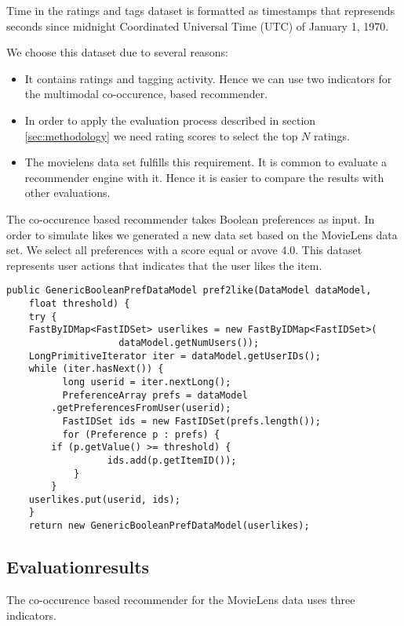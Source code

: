 Time in the ratings and tags dataset is formatted as timestamps that represends seconds since midnight Coordinated Universal Time (UTC) of January 1, 1970.
 
We choose this dataset due to several reasons:
\begin{itemize}
\item It contains ratings and tagging activity. Hence we can use two indicators for the multimodal co-occurence, based recommender.
\item In order to apply the evaluation process described in section \ref{sec:methodology} we need rating scores to select the top $N$ ratings.
\item The movielens data set fulfills this requirement. It is common to evaluate a recommender engine with it. Hence it is easier to compare the results with other evaluations. 
\end{itemize}

The co-occurence based recommender takes Boolean preferences as input. In order to simulate likes we generated a new data set based on the MovieLens data set. We select all preferences with a score  equal or avove 4.0. This dataset represents user actions that indicates that the user likes the item.

\begin{lstlisting}[caption={To simulate the user action ``like'' we extract all ratings equal or above a score of 4.0 and use the result as training set},label={lst:pref2like}]
 public GenericBooleanPrefDataModel pref2like(DataModel dataModel,
	float threshold) {
	try {
	FastByIDMap<FastIDSet> userlikes = new FastByIDMap<FastIDSet>(
					dataModel.getNumUsers());
	LongPrimitiveIterator iter = dataModel.getUserIDs();
	while (iter.hasNext()) {
          long userid = iter.nextLong();
          PreferenceArray prefs = dataModel
		.getPreferencesFromUser(userid);
          FastIDSet ids = new FastIDSet(prefs.length());
          for (Preference p : prefs) {
		if (p.getValue() >= threshold) {
                  ids.add(p.getItemID());
			}
		}
	userlikes.put(userid, ids);
	}
    return new GenericBooleanPrefDataModel(userlikes);
\end{lstlisting}

\subsection{Evaluationresults}

The co-occurence based recommender for the MovieLens data uses three \glspl{indicator}.

